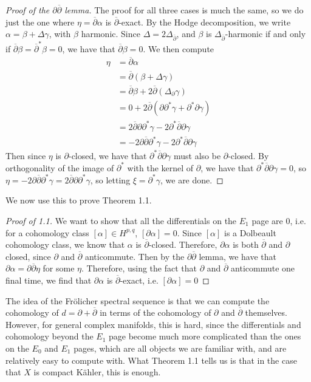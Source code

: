 \documentclass[psamsfonts, 12pt]{amsart}
\theoremstyle{definition}
\theoremstyle{remark}
\newcommand{\dbar}{\overline{\partial}}
\begin{document}
%
\begin{proof}[Proof of the $\partial\dbar$ lemma]
The proof for all three cases is much the same, so we do just the one where
$\eta = \dbar\alpha$ is $\dbar$-exact. By the Hodge decomposition, we write
$\alpha = \beta + \Delta\gamma$, with $\beta$ harmonic. Since
$\Delta = 2\Delta_{\dbar}$, and $\beta$ is $\Delta_{\dbar}$-harmonic if and only
if $\dbar\beta = \dbar^*\beta = 0$, we have that $\dbar\beta = 0$. We then compute
\begin{align*}
\eta &= \dbar\alpha \\
&= \dbar(\beta + \Delta\gamma) \\
&= \dbar\beta + 2\dbar(\Delta_\partial\gamma) \\
&= 0 + 2\dbar(\partial\partial^*\gamma + \partial^*\partial\gamma) \\
&= 2\dbar\partial\partial^*\gamma - 2\partial^*\dbar\partial\gamma \\
&= -2\partial\dbar\partial^*\gamma - 2\partial^*\dbar\partial\gamma
\end{align*}
Then since $\eta$ is $\partial$-closed, we have that $\partial^*\dbar\partial\gamma$
must also be $\partial$-closed. By orthogonality of the image of $\partial^*$ with
the kernel of $\partial$, we have that $\partial^*\dbar\partial\gamma = 0$,
so $\eta = -2\partial\dbar\partial^*\gamma = 2\dbar\partial\partial^*\gamma$,
so letting $\xi = \partial^*\gamma$, we are done.
\end{proof}
%
We now use this to prove Theorem 1.1.
%
\begin{proof}[Proof of 1.1]
We want to show that all the differentials on the $E_1$ page are $0$, i.e.
for a cohomology class $[\alpha] \in H^{p,q}$, $[\partial\alpha] = 0$. Since
$[\alpha]$ is a Dolbeault cohomology class, we know that $\alpha$ is $\dbar$-closed.
Therefore, $\partial\alpha$ is both $\dbar$ and $\partial$ closed, since $\partial$
and $\dbar$ anticommute. Then by the $\partial\dbar$ lemma, we have that
$\partial\alpha = \partial\dbar\eta$ for some $\eta$. Therefore, using the
fact that $\partial$ and $\dbar$ anticommute one final time, we find that
$\partial\alpha$ is $\dbar$-exact, i.e. $[\partial\alpha] = 0$
\end{proof}
%
The idea of the Fr\"olicher spectral sequence is that we can compute the
cohomology of $d = \partial + \dbar$ in terms of the cohomology of $\partial$
and $\dbar$ themselves. However, for general complex manifolds, this is hard,
since the differentials and cohomology beyond the $E_1$ page become much
more complicated than the ones on the $E_0$ and $E_1$ pages, which are all
objects we are familiar with, and are relatively easy to compute with. What
Theorem 1.1 tells us is that in the case that $X$ is compact K\"ahler, this
is enough.
%
\end{document}
